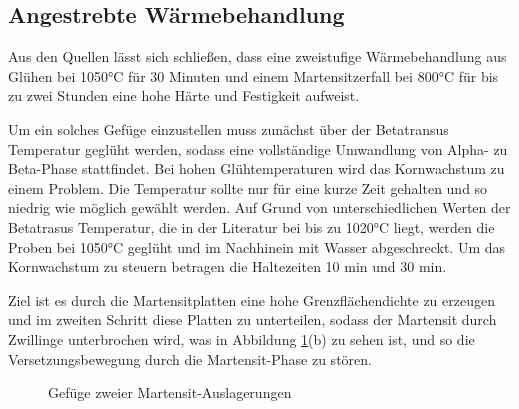 \documentclass[a4paper, 11pt]{tubsreprt}
\begin{document}
\subsection{Angestrebte Wärmebehandlung}
Aus den Quellen lässt sich schließen, dass eine zweistufige Wärmebehandlung aus Glühen bei 1050°C für 30 Minuten und einem Martensitzerfall bei 800°C für bis zu zwei Stunden eine hohe Härte und Festigkeit aufweist.

Um ein solches Gefüge einzustellen muss zunächst über der Betatransus Temperatur geglüht werden, sodass eine vollständige Umwandlung von Alpha- zu Beta-Phase stattfindet. Bei hohen Glühtemperaturen wird das Kornwachstum zu einem Problem. Die Temperatur sollte nur für eine kurze Zeit gehalten und so niedrig wie möglich gewählt werden. Auf Grund von unterschiedlichen Werten der Betatrasus Temperatur, die in der Literatur bei bis zu 1020°C liegt\cite{Tarin1995}, werden die Proben bei 1050°C geglüht und im Nachhinein mit Wasser abgeschreckt. Um das Kornwachstum zu steuern betragen die Haltezeiten 10 min und 30 min. 


Ziel ist es durch die Martensitplatten eine hohe Grenzflächendichte zu erzeugen und im zweiten Schritt diese Platten zu unterteilen, sodass der Martensit durch Zwillinge unterbrochen wird, was in Abbildung \ref{Gefügestruktur zweier Martensit Auslageungen}(b) zu sehen ist, und so die Versetzungsbewegung durch die Martensit-Phase zu stören.

\begin{figure}
\caption{Gefüge zweier Martensit-Auslagerungen}
\label{Gefügestruktur zweier Martensit Auslageungen}
\end{figure}
\end{document}
